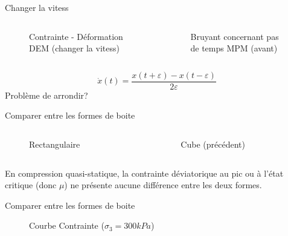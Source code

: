\documentclass[10pt]{beamer}
\begin{document}
\begin{frame}{Changer la vitess}
    \begin{columns}
        \begin{column}{0.5\textwidth}
            \begin{figure}[h]
                \centering
                \scalebox{0.5}{}
                \caption{Contrainte - Déformation DEM (changer la vitess)}
            \end{figure}
        \end{column}
        \begin{column}{0.5\textwidth}
            \begin{figure}[h]
                \centering
                \scalebox{0.5}{}
                \caption{Bruyant concernant pas de temps MPM (avant)}
            \end{figure}
        \end{column}
    \end{columns}
    \[
        \dot{x}(t) = \frac{x(t+\varepsilon) - x(t-\varepsilon)}{2\varepsilon}
    \]
    Problème de arrondir?
\end{frame}

\begin{frame}{Comparer entre les formes de boite}
    \begin{columns}
        \begin{column}{0.5\textwidth}
            \begin{figure}[h]
                \centering
                \scalebox{0.5}{}
                \caption{Rectangulaire}
            \end{figure}
        \end{column}
        \begin{column}{0.5\textwidth}
            \begin{figure}[h]
                \centering
                \scalebox{0.5}{}
                \caption{Cube (précédent)}
            \end{figure}
        \end{column}
    \end{columns}
    En compression quasi-statique, la contrainte déviatorique au pic ou à l’état critique (donc  $\mu$) ne présente aucune différence entre les deux formes.
\end{frame}


\begin{frame}{Comparer entre les formes de boite}
    \begin{figure}[h]
        \centering
        \scalebox{0.7}{}
        \caption{Courbe Contrainte ($\sigma_3 = 300kPa$)}
    \end{figure}
\end{frame}
\end{document}
